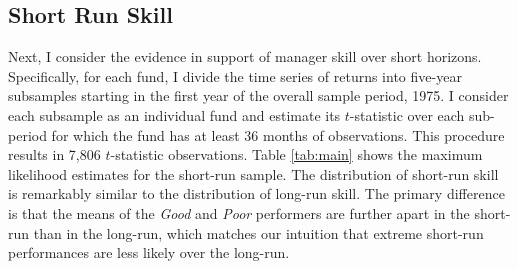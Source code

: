 	\subsection{Short Run Skill}
		Next, I consider the evidence in support of manager skill over short horizons. Specifically, for each fund, I divide the time series of returns into five-year subsamples starting in the first year of the overall sample period, 1975. I consider each subsample as an individual fund and estimate its $t$-statistic over each sub-period for which the fund has at least 36 months of observations. This procedure results in 7,806 $t$-statistic observations. Table \ref{tab:main} shows the maximum likelihood estimates for the short-run sample. The distribution of short-run skill is remarkably similar to the distribution of long-run skill. The primary difference is that the means of the \textit{Good} and \textit{Poor} performers are further apart in the short-run than in the long-run, which matches our intuition that extreme short-run performances are less likely over the long-run.

